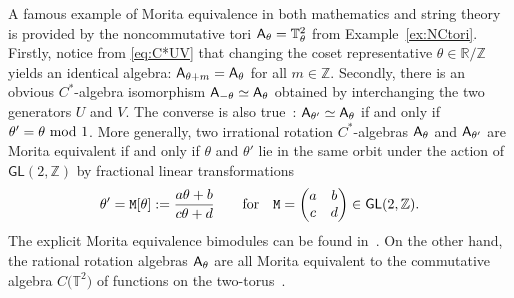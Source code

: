 \documentclass[pdftex]{sigma}
\numberwithin{equation}{section}
\newcommand{\Z}{\zed}
\def\A{{\sf A}}
\newcommand{\sfGL}{\mathsf{GL}}
\newcommand{\zed}{{\mathbb Z}} %
\newcommand{\real}{{\mathbb R}} %
\newcommand{\torus}{{\mathbb T}} %
\begin{document}
\begin{Example}\label{ex:NCT2Morita}
A famous example of Morita equivalence in both mathematics and string
theory is provided by the
noncommutative tori ${\sf A}_\theta=\torus_\theta^2$ from
Example~\ref{ex:NCtori}. Firstly, notice from \eqref{eq:C*UV} that
changing the coset representative $\theta\in\real/\Z$ yields an identical
algebra: $\A_{\theta+m}=\A_{\theta}$ for all $m\in\Z$. Secondly, there
is an obvious
$C^*$-algebra isomorphism $\A_{-\theta}\simeq\A_\theta$ obtained by
interchanging the two generators $U$ and $V$. The converse
is also true~\cite{Rieffel1981,Rieffel1982}:
$\A_{\theta'}\simeq\A_{\theta}$ if and only if $\theta'=\theta \ {\rm
 mod}~1$. More generally, two irrational rotation $C^*$-algebras
$\A_\theta$ and $\A_{\theta'}$ are
Morita equivalent if and only if $\theta$ and $\theta'$ lie in the
same orbit under the action of $\sfGL(2,\Z)$ by fractional linear
transformations
\[
\theta'={\tt M}[\theta]:=\frac{a \theta+b}{c \theta+d} \qquad
\mbox{for} \quad {\tt M}=\bigg(\begin{matrix} a & b \\ c &
 d \end{matrix}\bigg) \in \sfGL(2,\Z) .
\]
The explicit Morita equivalence bimodules can be found
in~\cite{Rieffel1981}. On the other hand, the rational rotation
algebras $\A_\theta$ are all Morita equivalent to the commutative
algebra $C\big(\torus^2\big)$ of functions on the
two-torus~\cite{Rieffel1982}.
\end{Example}
\end{document}
